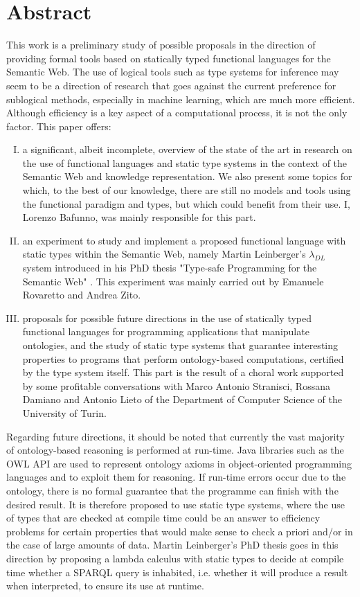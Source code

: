 \chapter{Abstract}
This work is a preliminary study of possible proposals in the direction of providing formal tools based on statically typed functional languages for the Semantic Web. The use of logical tools such as type systems for inference may seem to be a direction of research that goes against the current preference for sublogical methods, especially in machine learning, which are much more efficient. Although efficiency is a key aspect of a computational process, it is not the only factor.
This paper offers:
\begin{enumerate}[I.]
	\item a significant, albeit incomplete, overview of the state of the art in research on the use of functional languages and static type systems in the context of the Semantic Web and knowledge representation. We also present some topics for which, to the best of our knowledge, there are still no models and tools using the functional paradigm and types, but which could benefit from their use. I, Lorenzo Bafunno, was mainly responsible for this part.
	\item  an experiment to study and implement a proposed functional language with static types within the Semantic Web, namely Martin Leinberger's $\lambda_{DL}$ system introduced in his PhD thesis "Type-safe Programming for the Semantic Web" \cite{leinbergerphdthesis}. This experiment was mainly carried out by Emanuele Rovaretto and Andrea Zito.
	\item proposals for possible future directions in the use of statically typed functional languages for programming applications that manipulate ontologies, and the study of static type systems that guarantee interesting properties to programs that perform ontology-based computations, certified by the type system itself. This part is the result of a choral work supported by some profitable conversations with Marco Antonio Stranisci, Rossana Damiano and Antonio Lieto of the Department of Computer Science of the University of Turin.
\end{enumerate}
Regarding future directions, it should be noted that currently the vast majority of ontology-based reasoning is performed at run-time. Java libraries such as the OWL API \cite{OWLAPI} are used to represent ontology axioms in object-oriented programming languages and to exploit them for reasoning. If run-time errors occur due to the ontology, there is no formal guarantee that the programme can finish with the desired result. It is therefore proposed to use static type systems, where the use of types that are checked at compile time could be an answer to efficiency problems for certain properties that would make sense to check a priori and/or in the case of large amounts of data. Martin Leinberger's PhD thesis \cite{leinbergerphdthesis} goes in this direction by proposing a lambda calculus with static types to decide at compile time whether a SPARQL query is inhabited, i.e. whether it will produce a result when interpreted, to ensure its use at runtime.